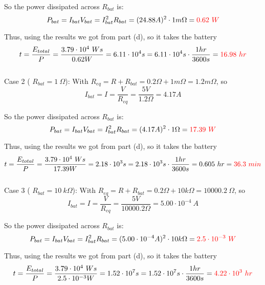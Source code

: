 \documentclass{article}
\begin{document}
So the power dissipated across $R_{bat}$ is:
$$P_{bat} = I_{bat}V_{bat} = I_{bat}^2R_{bat} = (24.88A)^2\cdot1m\Omega = {\color{red} 0.62\ W}$$

Thus, using the results we got from part (d), so it takes the battery $$t = \frac{E_{total}}{P} = \frac{3.79\cdot10^4\ Ws}{0.62W} = 6.11\cdot10^4s = 6.11\cdot10^4s\cdot\frac{1hr}{3600s} = {\color{red} 16.98\ hr}$$ \\[.5cm]
Case 2 ({\color{red} $R_{bat} = 1\ \Omega$}): With $R_{eq} = R + R_{bat} = 0.2\Omega + 1 m\Omega = 1.2 m\Omega$, so
$$I_{bat} = I = \frac{V}{R_{eq}} = \frac{5V}{1.2\Omega} = 4.17A$$

So the power dissipated across $R_{bat}$ is:
$$P_{bat} = I_{bat}V_{bat} = I_{bat}^2R_{bat} = (4.17A)^2\cdot1\Omega = {\color{red} 17.39\ W}$$

Thus, using the results we got from part (d), so it takes the battery $$t = \frac{E_{total}}{P} = \frac{3.79\cdot10^4\ Ws}{17.39W} = 2.18\cdot10^3s = 2.18\cdot10^3s\cdot\frac{1hr}{3600s} = 0.605\ hr = {\color{red} 36.3\ min}$$ \\[.5cm]
Case 3 ({\color{red} $R_{bat} = 10\ k\Omega$}): With $R_{eq} = R + R_{bat} = 0.2\Omega + 10k\Omega = 10000.2\ \Omega$, so
$$I_{bat} = I = \frac{V}{R_{eq}} = \frac{5V}{10000.2\Omega} = 5.00\cdot10^{-4}\ A$$

So the power dissipated across $R_{bat}$ is:
$$P_{bat} = I_{bat}V_{bat} = I_{bat}^2R_{bat} = (5.00\cdot10^{-4}A)^2\cdot10k\Omega = {\color{red} 2.5\cdot10^{-3}\ W}$$

Thus, using the results we got from part (d), so it takes the battery $$t = \frac{E_{total}}{P} = \frac{3.79\cdot10^4\ Ws}{2.5\cdot10^{-3} W} = 1.52\cdot10^7s = 1.52\cdot10^7s\cdot\frac{1hr}{3600s} = {\color{red} 4.22\cdot10^3\ hr}$$
\end{document}
